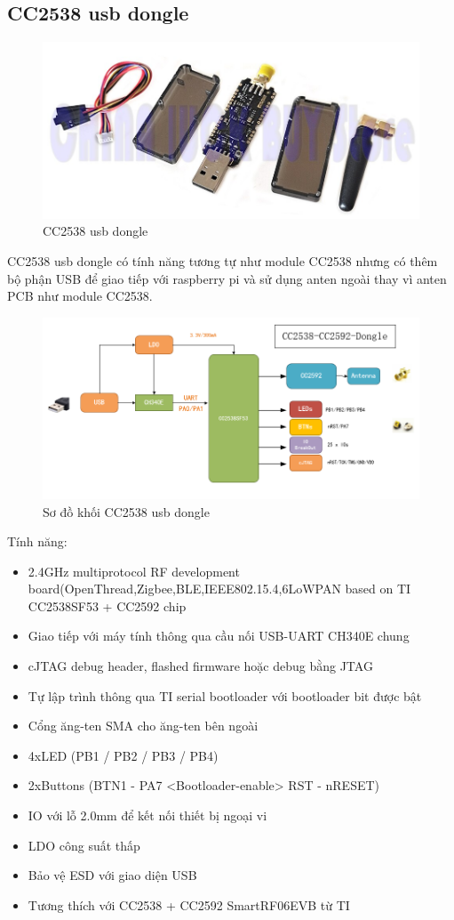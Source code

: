 \documentclass{report}
\begin{document}
\subsection{CC2538 usb dongle}
\begin{figure}[h]
	\centering
	\includegraphics[scale = 0.24]{fig37.png}
	\caption{CC2538 usb dongle}
	\label{fig:Graph37}
\end{figure}
CC2538 usb dongle có tính năng tương tự như module CC2538 nhưng có thêm bộ phận USB để giao tiếp với raspberry pi và sử dụng anten ngoài thay vì anten PCB như module CC2538.
\newpage
\begin{figure}[h]
	\centering
	\includegraphics[scale = 0.5]{fig38.png}
	\caption{Sơ đồ khối CC2538 usb dongle}
	\label{fig:Graph38}
\end{figure}
Tính năng:
\begin{itemize}
	\item 2.4GHz multiprotocol RF development board(OpenThread,Zigbee,BLE,IEEE802.15.4,6LoWPAN based on TI CC2538SF53 + CC2592 chip
	\item Giao tiếp với máy tính thông qua cầu nối USB-UART CH340E chung
	\item cJTAG debug header, flashed firmware hoặc debug bằng JTAG
	\item Tự lập trình thông qua TI serial bootloader với bootloader bit được bật
	\item Cổng ăng-ten SMA cho ăng-ten bên ngoài
	\item 4xLED (PB1 / PB2 / PB3 / PB4)
	\item 2xButtons (BTN1 - PA7 <Bootloader-enable> RST - nRESET)
	\item IO với lỗ 2.0mm để kết nối thiết bị ngoại vi
	\item LDO công suất thấp
	\item Bảo vệ ESD với giao diện USB
	\item Tương thích với CC2538 + CC2592 SmartRF06EVB từ TI
\end{itemize}
\end{document}
